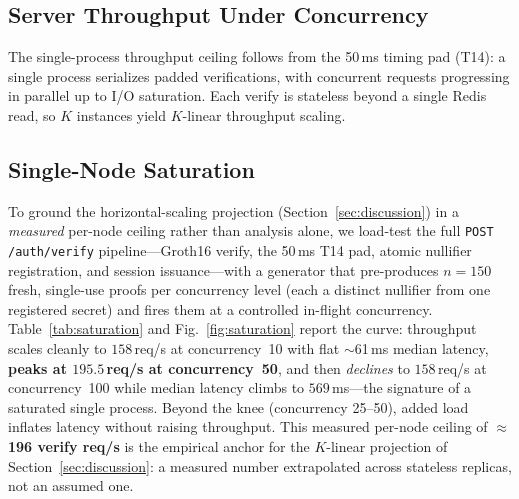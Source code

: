 \documentclass[journal,twoside,10pt]{IEEEtran}
\begin{document}
\subsection{Server Throughput Under Concurrency}
\begin{table}[!t]
\renewcommand{\arraystretch}{1.2}
\caption{Server Verification Throughput ($n=10$ bursts/level, Apple M4,
single Node.js process, localhost).}
\label{tab:throughput}
\centering
{}
\end{table}

The single-process throughput ceiling follows from the
50\,ms timing pad (T14): a single process serializes padded verifications,
with concurrent requests progressing in parallel up to I/O saturation. Each
verify is stateless beyond a single Redis read, so $K$ instances yield
$K$-linear throughput scaling.

\subsection{Single-Node Saturation}
\label{sec:saturation}
To ground the horizontal-scaling projection (Section~\ref{sec:discussion})
in a \emph{measured} per-node ceiling rather than analysis alone, we
load-test the full \texttt{POST /auth/verify} pipeline---Groth16 verify,
the 50\,ms T14 pad, atomic nullifier registration, and session
issuance---with a generator that pre-produces $n{=}150$ fresh, single-use
proofs per concurrency level (each a distinct nullifier from one registered
secret) and fires them at a controlled in-flight concurrency.
Table~\ref{tab:saturation} and Fig.~\ref{fig:saturation} report the curve:
throughput scales cleanly to $158$\,req/s at concurrency~10 with flat
$\sim$61\,ms median latency, \textbf{peaks at $195.5$\,req/s at
concurrency~50}, and then \emph{declines} to $158$\,req/s at
concurrency~100 while median latency climbs to $569$\,ms---the signature of
a saturated single process. Beyond the knee (concurrency 25--50), added
load inflates latency without raising throughput. This measured per-node
ceiling of $\approx$\textbf{196 verify req/s} is the empirical anchor for
the $K$-linear projection of Section~\ref{sec:discussion}: a measured
number extrapolated across stateless replicas, not an assumed one.
\end{document}

